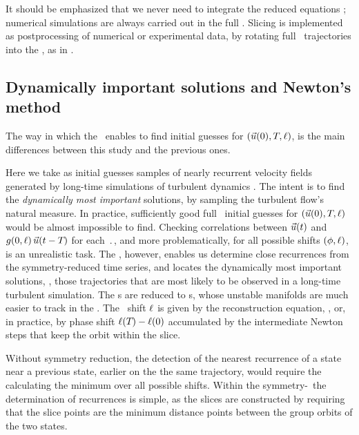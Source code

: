 It should be emphasized that we never need to integrate the reduced
equations ; numerical simulations are always carried
out in the full \statesp. Slicing is implemented as postprocessing of
numerical or experimental data, by rotating full \statesp\ trajectories
into the \slice, as in .


\subsection{Dynamically important solutions and Newton's method}
\label{s:reqva}

The way in which the \mslices\ enables to find initial
guesses for $(\vec{u}(0),{T_{}},\ell)$, is the main differences
between this study and the previous ones.

Here we take as initial guesses samples of nearly recurrent velocity
fields generated by long-time simulations of turbulent dynamics
. The intent is to find the {\em dynamically most
important} solutions, by sampling the turbulent flow's natural measure.
In practice, sufficiently good full \statesp\ initial guesses for
$(\vec{u}(0),{T_{}},\ell)$ would be almost impossible to find.
Checking correlations between $\vec{u}(t)$ and
$g(0,\ell)\,\vec{u}(t-{T_{}})$ for each $\period{}$, and
more problematically, for all possible shifts $(\phi,\ell)$, is an
unrealistic task. The \mslices, however, enables us determine close
recurrences  from the symmetry-reduced time series, and locates the
dynamically most important solutions, \ie, those trajectories that are
most likely to be observed in a long-time turbulent simulation. The \rpo
s are reduced to \po s, whose unstable manifolds are much easier to track
in the \reducedsp. The \rpo\ shift $\ell$ is given by the
reconstruction equation, , or, in practice, by phase
shift $\ell({T_{}})-\ell(0)$ accumulated by the intermediate
Newton steps that keep the orbit within the slice.

Without symmetry reduction, the detection of the nearest recurrence of a
state near a previous state, earlier on the the same trajectory, would
require the calculating the minimum over all possible shifts. Within the
symmetry-\reducedsp\ the determination of recurrences is simple, as the
slices are constructed by requiring that the slice points are the minimum
distance points between the group orbits of the two states.
